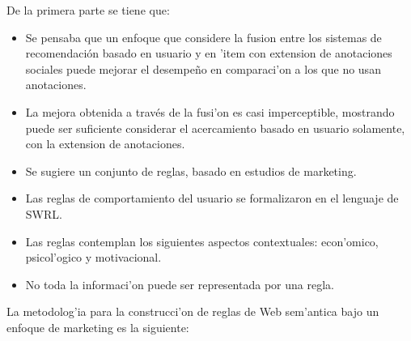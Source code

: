 \documentclass[11pt]{article}
\begin{document}
De la primera parte se tiene que:
\begin{itemize}
\item Se pensaba que un enfoque que considere la fusion entre los sistemas de recomendación basado en usuario y en 'item con extension de anotaciones sociales puede mejorar el desempeño en comparaci'on a los que no usan anotaciones.
\item La mejora obtenida a través de la fusi'on es casi imperceptible, mostrando puede ser suficiente considerar el acercamiento basado en usuario solamente, con la extension de anotaciones.
\item Se sugiere un conjunto de reglas, basado en estudios de marketing.
\item Las reglas de comportamiento del usuario se formalizaron en el lenguaje de SWRL.
\item Las reglas contemplan los siguientes aspectos contextuales: econ'omico, psicol'ogico y motivacional.
\item No toda la informaci'on puede ser representada por una regla.
\end{itemize}

La metodolog'ia para la construcci'on de reglas de Web sem'antica bajo un enfoque de marketing es la siguiente:
\end{document}
